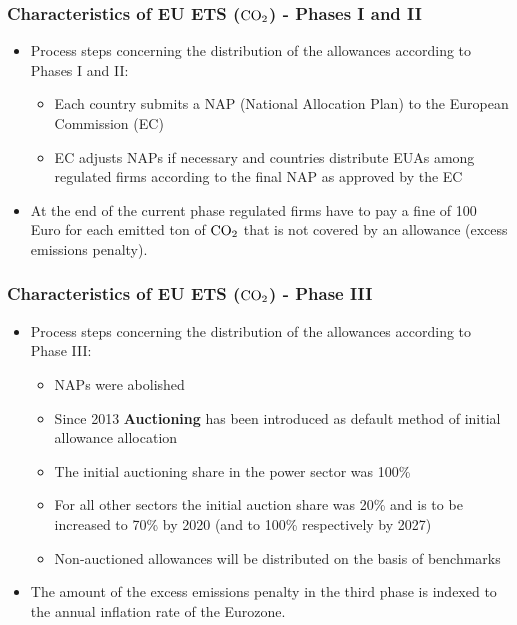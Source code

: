 {  \begin{frame}
  \frametitle{Characteristics of EU ETS ($\textnormal{CO}_2$) - Phases I and II}
  \begin{itemize}
  \item<1-> Process steps concerning the distribution of the allowances according to Phases I and II:
  \begin{itemize}
  \item Each country submits a NAP (National Allocation Plan) to the European Commission (EC)
  \item EC adjusts NAPs if necessary and countries distribute EUAs among regulated firms according to the final NAP as approved by the EC
  \end{itemize}
  \item<2-> At the end of the current phase regulated firms have to pay a fine of 100 Euro for each emitted ton of $\textnormal{CO}_2$ that is not covered by an allowance (excess emissions penalty).
  \end{itemize}
\end{frame}

  \begin{frame}
  \frametitle{Characteristics of EU ETS ($\textnormal{CO}_2$) - Phase III}
  \begin{itemize}
  \item<1-> Process steps concerning the distribution of the allowances according to Phase III:
  \begin{itemize}
  \item NAPs were  abolished
  \item Since 2013  \textbf{Auctioning} has been  introduced as default method of initial allowance allocation
  \item The initial auctioning share  in the power sector was 100\%
  \item For all other sectors the initial auction share was  20\% and is to be increased to 70\% by 2020 (and to 100\% respectively by 2027)
  \item Non-auctioned allowances will be distributed on the basis of benchmarks
  \end{itemize}
  \item<2-> The amount of the excess emissions penalty in the third phase is indexed to the annual inflation rate of the Eurozone.  %
  \end{itemize}
\end{frame}

}
